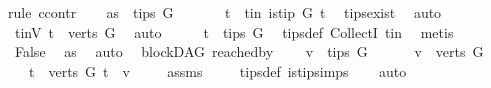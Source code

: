 \begin{isabellebody}
\isatagproof
{}\isamarkupfalse%
{\isacharparenleft}{\kern0pt}rule\ ccontr{\isacharparenright}{\kern0pt}\isanewline
\ \ \isamarkupfalse%
\ as{}{\isacharcolon}{\kern0pt}\ {\isachardoublequoteopen}{\isasymnot}\ tips\ G\ {\isasymnoteq}\ {\isacharbraceleft}{\kern0pt}{\isacharbraceright}{\kern0pt}{\isachardoublequoteclose}\ \isanewline
\ \ \isamarkupfalse%
\ t\ \ t{\isacharunderscore}{\kern0pt}in{\isacharcolon}{\kern0pt}\ {\isachardoublequoteopen}is{\isacharunderscore}{\kern0pt}tip\ G\ t{\isachardoublequoteclose}\ \isamarkupfalse%
\ tips{\isacharunderscore}{\kern0pt}exist\ \isamarkupfalse%
\ auto\isanewline
\ \ \isamarkupfalse%
\ \isamarkupfalse%
\ t{\isacharunderscore}{\kern0pt}inV{\isacharcolon}{\kern0pt}\ {\isachardoublequoteopen}t\ {\isasymin}\ verts\ G{\isachardoublequoteclose}\ \isamarkupfalse%
\ auto\isanewline
\ \ \isamarkupfalse%
\ \isamarkupfalse%
\ {\isachardoublequoteopen}t\ {\isasymin}\ tips\ G{\isachardoublequoteclose}\ \isamarkupfalse%
\ tips{\isacharunderscore}{\kern0pt}def\ CollectI\ t{\isacharunderscore}{\kern0pt}in\ \isamarkupfalse%
\ metis\isanewline
\ \ \isamarkupfalse%
\ \isamarkupfalse%
\ False\ \isamarkupfalse%
\ as{}\ \isamarkupfalse%
\ auto\isanewline
{}\isamarkupfalse%
%
\endisatagproof
{\isafoldproof}%
%
\isadelimproof
\isanewline
%
\endisadelimproof
\isanewline
\isanewline
{}\isamarkupfalse%
\ {\isacharparenleft}{\kern0pt}\ blockDAG{\isacharparenright}{\kern0pt}\ reached{\isacharunderscore}{\kern0pt}by{\isacharcolon}{\kern0pt}\ \isanewline
\ \ \ {\isachardoublequoteopen}v\ {\isasymnotin}\ tips\ G{\isachardoublequoteclose}\isanewline
\ \ \ \ \ \ {\isachardoublequoteopen}v\ {\isasymin}\ verts\ G{\isachardoublequoteclose}\isanewline
\ \ \ {\isachardoublequoteopen}{\isasymexists}t\ {\isasymin}\ verts\ G{\isachardot}{\kern0pt}\ t\ {\isasymrightarrow}\isactrlsup {\isacharplus}{\kern0pt}\ v{\isachardoublequoteclose}\ \isanewline
%
\isadelimproof
\ \ %
\endisadelimproof
%
\isatagproof
{}\isamarkupfalse%
\ assms\ \isanewline
\ \ \isamarkupfalse%
\ tips{\isacharunderscore}{\kern0pt}def\ is{\isacharunderscore}{\kern0pt}tip{\isachardot}{\kern0pt}simps\isanewline
\ \ \isamarkupfalse%
\ auto%

\end{isabellebody}
